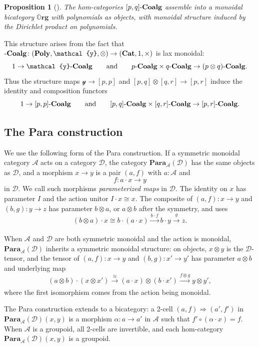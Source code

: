 \documentclass[11pt, oneside, article]{memoir}
\theoremstyle{definition}
\theoremstyle{plain}
\newtheorem{proposition}[proposition]{Proposition}
\DeclarePairedDelimiter{\ihom}{[}{]}
\newcommand{\cat}[1]{\mathcal{#1}}%
\newcommand{\Cat}[1]{\mathbf{#1}}%
\newcommand{\To}[2][]{\xrightarrow[#1]{#2}}
\newcommand{\tn}[1]{\textnormal{#1}}
\newcommand{\smcat}{\Cat{Cat}}
\newcommand{\yon}{\mathcal{y}}
\newcommand{\poly}{\Cat{Poly}}
\newcommand{\qqand}{\qquad\text{and}\qquad}
\newcommand{\coalg}{\tn{-}\Cat{Coalg}}
\newcommand{\org}{{\mathbb{O}\Cat{rg}}}
\newcommand{\Para}{\Cat{Para}}
\newcommand{\para}[2]{\Para_{#1}(#2)}
\begin{document}
\begin{proposition}[\cite{spivak2021learners,shapiro2022dynamic}]\label{prop.org}
The hom-categories $\ihom{p,q}\coalg$ assemble into a monoidal bicategory $\org$ with polynomials as objects, with monoidal structure induced by the Dirichlet product on polynomials.
\end{proposition}

This structure arises from the fact that $\coalg\colon(\poly,\yon,\otimes)\to(\smcat,1,\times)$ is lax monoidal:
\[
1\to\yon\coalg
\qqand
p\coalg\times q\coalg\to(p\otimes q)\coalg.
\]
Thus the structure maps $\yon\to[p,p]$ and $[p,q]\otimes[q,r]\to[p,r]$ induce the identity and composition functors
\[
1\to[p,p]\coalg
\qqand
[p,q]\coalg\times[q,r]\coalg\to[p,r]\coalg.
\]

\subsection{The Para construction}\label{sec.para_general}

We use the following form of the Para construction. If a symmetric monoidal category $\cat{A}$ acts on a category $\cat{D}$, the category $\para{\cat{A}}{\cat{D}}$ has the same objects as $\cat{D}$, and a morphism $x\to y$ is a pair $(a,f)$ with $a:\cat{A}$ and
\[
f\colon a\cdot x\to y
\]
in $\cat{D}$. We call such morphisms \emph{parameterized maps} in $\cat D$. The identity on $x$ has parameter $I$ and the action unitor $I\cdot x\cong x$. The composite of $(a,f)\colon x\to y$ and $(b,g)\colon y\to z$ has parameter $b\otimes a$, or $a\otimes b$ after the symmetry, and uses
\begin{equation}\label{eqn.para_map}
(b\otimes a)\cdot x\cong b\cdot(a\cdot x)\To{b\cdot f}b\cdot y\To{g}z.
\end{equation}

When $\cat A$ and $\cat D$ are both symmetric monoidal and the action is monoidal, $\para{\cat A}{\cat D}$ inherits a symmetric monoidal structure: on objects, $x\otimes y$ is the $\cat D$-tensor, and the tensor of $(a,f)\colon x\to y$ and $(b,g)\colon x'\to y'$ has parameter $a\otimes b$ and underlying map
\begin{equation}\label{eqn.para_tensor}
(a\otimes b)\cdot(x\otimes x')\To{\cong}(a\cdot x)\otimes(b\cdot x')\To{f\otimes g}y\otimes y',
\end{equation}
where the first isomorphism comes from the action being monoidal.

The Para construction extends to a bicategory: a 2-cell $(a,f)\Rightarrow(a',f')$ in $\para{\cat A}{\cat D}(x,y)$ is a morphism $\alpha\colon a\to a'$ in $\cat A$ such that $f'\circ(\alpha\cdot x)=f$. When $\cat A$ is a groupoid, all 2-cells are invertible, and each hom-category $\para{\cat A}{\cat D}(x,y)$ is a groupoid.
\end{document}
